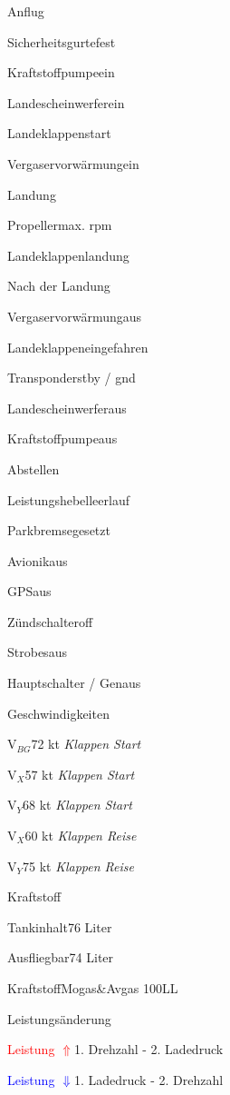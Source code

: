   \begin{checklist}{Anflug}
    \item{Sicherheitsgurte}{fest}
    \item{Kraftstoffpumpe}{ein}
    \item{Landescheinwerfer}{ein}
    \item{Landeklappen}{start}
    \item{Vergaservorwärmung}{ein}
  \end{checklist}

  \begin{checklist}{Landung}
    \item{Propeller}{max. rpm}
    \item{Landeklappen}{landung}
  \end{checklist}

  \begin{checklist}{Nach der Landung}
    \item{Vergaservorwärmung}{aus}
    \item{Landeklappen}{eingefahren}
    \item{Transponder}{stby / gnd}
    \item{Landescheinwerfer}{aus}
    \item{Kraftstoffpumpe}{aus}
  \end{checklist}

  \begin{checklist}{Abstellen}
    \item{Leistungshebel}{leerlauf}
    \item{Parkbremse}{gesetzt}
    \item{Avionik}{aus}
    \item{GPS}{aus}
    \item{Zündschalter}{off}
    \item{Strobes}{aus}
    \item{Hauptschalter / Gen}{aus}
  \end{checklist}

  \begin{checklist}{Geschwindigkeiten}
    \item{V$_{BG}$}{72 kt \textit{Klappen Start}}
    \item{V$_{X}$}{57 kt \textit{Klappen Start}}
    \item{V$_{Y}$}{68 kt \textit{Klappen Start}}
    \item{V$_{X}$}{60 kt \textit{Klappen Reise}}
    \item{V$_{Y}$}{75 kt \textit{Klappen Reise}}
  \end{checklist}
  \begin{checklist}{Kraftstoff}
    \item{Tankinhalt}{76 Liter}
    \item{Ausfliegbar}{74 Liter}
    \item{Kraftstoff}{Mogas\&Avgas 100LL}
  \end{checklist}

  \begin{checklist}{Leistungsänderung}
    \item{\textcolor{red}{Leistung $\Uparrow$}}{1. Drehzahl - 2. Ladedruck}
    \item{\textcolor{blue}{Leistung $\Downarrow$}}{1. Ladedruck - 2. Drehzahl}
\end{checklist}


